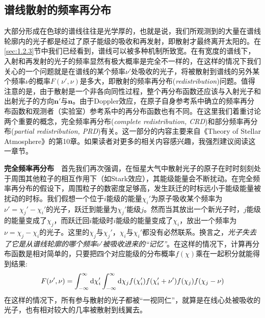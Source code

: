 \subsection{谱线散射的频率再分布}
大部分形成在色球的谱线往往是光学厚的，也就是说，我们所观测到的大量在谱线轮廓内的光子都是经过了原子能级的吸收和再发射，即散射才最终离开太阳的。在\ref{sec:1.2.3}节中我们已经看到，谱线可以被多种机制所致宽。在有宽度的谱线下，入射和再发射的光子的频率显然有极大概率是完全不一样的，在这样的情况下我们关心的一个问题就是在谱线的某个频率$\nu'$处吸收的光子，将被散射到谱线的另外某个频率$\nu$的概率$F(\nu',\nu)$是多大，即散射的频率再分布(\textit{redistribution})问题。值得注意的是，由于散射是一个非各向同性过程，整个再分布函数还应该与入射光子和出射光子的方向$\boldsymbol{n}' $与$\boldsymbol{n}$。由于Doppler效应，在原子自身参考系中确立的频率再分布函数和观测者（实验室）参考系中的再分布函数也有不同。在这里我们着重讨论两个重要的概念，完全频率再分布(\textit{complete redistribution, CRD})和部分频率再分布(\textit{partial redistribution, PRD})有关。这一部分的内容主要来自《Theory of Stellar Atmosphere》\parencite{Mihalas2014}的第10章。如果读者对更多的相关内容感兴趣，我强烈建议阅读这一章节。

\noindent
\textbf{完全频率再分布}\ \ 首先我们再次强调，在恒星大气中散射光子的原子在时时刻刻处于周围其他粒子的相互作用下（如Stark效应），其能级能量会不断扰动。在完全频率再分布的假设下，周围粒子的数密度足够高，发生跃迁的时标远小于能级能量被扰动的时标。我们假想一个位于$i$能级的能量$\chi_i'$为原子吸收某个频率为$\nu' = \chi_j' - \chi_i'$的光子，跃迁到能量为$\chi_j'$能级$j$。然而当其放出一个新光子时，$j$能级的能量变成了$\chi_j$，而跃迁回$i$能级时$i$能级的能量变成了$\chi_i$，放出一个频率为$\nu = \chi_j - \chi_i $的光子。这里的$\chi_j$与$\chi_j'$，$\chi_i$与$\chi_i'$都没有必然联系。换言之，\emph{光子失去了它是从谱线轮廓的哪个频率$\nu'$被吸收进来的“记忆”}。在这样的情况下，计算再分布函数是相对简单的，只要把四个对应能级的分布概率$f(\chi)$乘在一起积分就能得到结果\parencites{Mihalas2014}:
\begin{equation}
	F(\nu',\nu) = \int_{-\infty}^{\infty}\mathrm{d} \chi_i' \int_{-\infty}^{\infty}\mathrm{d} \chi_j f(\chi_i')f(\chi_i' + \nu')f(\chi_j)f(\chi_j - \nu)
\end{equation}
在这样的情况下，所有参与散射的光子都被“一视同仁”，就算是在线心处被吸收的光子，也有相对较大的几率被散射到线翼去。

